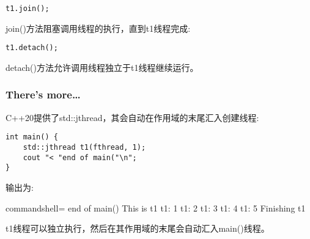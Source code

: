\begin{lstlisting}[style=styleCXX]
t1.join();
\end{lstlisting}

join()方法阻塞调用线程的执行，直到t1线程完成:

\begin{lstlisting}[style=styleCXX]
t1.detach();
\end{lstlisting}

detach()方法允许调用线程独立于t1线程继续运行。

\subsubsection{There's more…}

C++20提供了std::jthread，其会自动在作用域的末尾汇入创建线程:

\begin{lstlisting}[style=styleCXX]
int main() {
	std::jthread t1(fthread, 1);
	cout "< "end of main("\n";
}
\end{lstlisting}

输出为:

\begin{tcblisting}{commandshell={}}
end of main()
This is t1
t1: 1
t1: 2
t1: 3
t1: 4
t1: 5
Finishing t1
\end{tcblisting}

t1线程可以独立执行，然后在其作用域的末尾会自动汇入main()线程。











